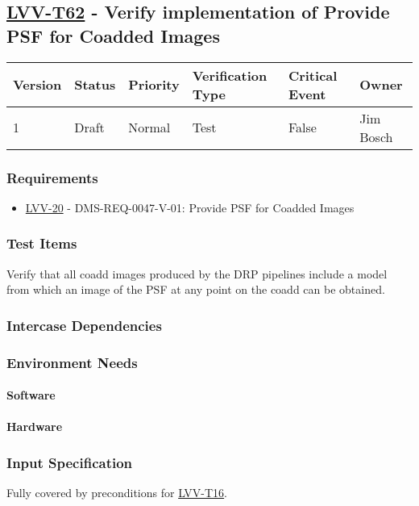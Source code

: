 \subsection{\href{https://jira.lsstcorp.org/secure/Tests.jspa\#/testCase/LVV-T62}{LVV-T62}
    - Verify implementation of Provide PSF for Coadded Images}\label{lvv-t62}

\begin{longtable}[]{llllll}
\toprule
Version & Status & Priority & Verification Type & Critical Event & Owner
\\\midrule
1 & Draft & Normal &
Test & False & Jim Bosch
\\\bottomrule
\end{longtable}

\subsubsection{Requirements}
\begin{itemize}
\item \href{https://jira.lsstcorp.org/browse/LVV-20}{LVV-20} - DMS-REQ-0047-V-01: Provide PSF for Coadded Images
\end{itemize}

\subsubsection{Test Items}
Verify that all coadd images produced by the DRP pipelines include a
model from which an image of the PSF at any point on the coadd can be
obtained.



\subsubsection{Intercase Dependencies}

\subsubsection{Environment Needs}

\paragraph{Software}

\paragraph{Hardware}

\subsubsection{Input Specification}
Fully covered by preconditions for
\href{https://jira.lsstcorp.org/secure/Tests.jspa\#/testCase/LVV-T16}{LVV-T16}.


